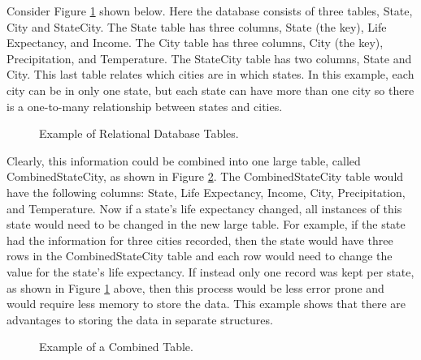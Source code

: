 \documentclass{article}[11pt]
\begin{document}
Consider Figure \ref{Fig:DBTab} shown below.  Here the database consists of
three tables, State, City and StateCity.  The State table has three columns,
State (the key), Life Expectancy, and Income.  The City table has three
columns, City (the key), Precipitation, and Temperature.  The StateCity table
has two columns, State and City.  This last table relates which cities are in
which states.  In this example, each city can be in only one state, but each
state can have more than one city so there is a one-to-many relationship
between states and cities.


\begin{figure}[ht]
  \begin{center}
    \caption{ Example of Relational Database Tables. }
    \label{Fig:DBTab}
  \end{center}
\end{figure}

Clearly, this information could be combined into one large table, called
CombinedStateCity, as shown in Figure \ref{Fig:OneDBTab}.  The
CombinedStateCity table would have the following columns: State, Life
Expectancy, Income, City, Precipitation, and Temperature.  Now if a state's
life expectancy changed, all instances of this state would need to be changed
in the new large table.  For example, if the state had the information for
three cities recorded, then the state would have three rows in the
CombinedStateCity table and each row would need to change the value for the
state's life expectancy.  If instead only one record was kept per state, as
shown in Figure \ref{Fig:DBTab} above, then this process would be less error
prone and would require less memory to store the data.  This example shows
that there are advantages to storing the data in separate structures.


\begin{figure}[ht]
  \begin{center}
    \caption{ Example of a Combined Table. }
    \label{Fig:OneDBTab}
  \end{center}
\end{figure}
\end{document}
